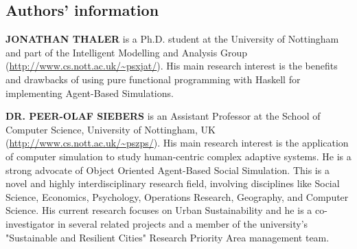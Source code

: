 \documentclass{bmcart}
\begin{document}
\begin{backmatter}
\section*{Authors' information}
\textbf{\uppercase{JONATHAN THALER}} is a Ph.D. student at the University of Nottingham and part of the Intelligent Modelling and Analysis Group (\url{http://www.cs.nott.ac.uk/~psxjat/}). His main research interest is the benefits and drawbacks of using pure functional programming with Haskell for implementing Agent-Based Simulations.

\textbf{\uppercase{Dr. PEER-OLAF SIEBERS}} is an Assistant Professor at the School of Computer Science, University of Nottingham, UK (\url{http://www.cs.nott.ac.uk/~pszps/}). His main research interest is the application of computer simulation to study human-centric complex adaptive systems. He is a strong advocate of Object Oriented Agent-Based Social Simulation. This is a novel and highly interdisciplinary research field, involving disciplines like Social Science, Economics, Psychology, Operations Research, Geography, and Computer Science. His current research focuses on Urban Sustainability and he is a co-investigator in several related projects and a member of the university's "Sustainable and Resilient Cities" Research Priority Area management team.




\end{backmatter}
\end{document}
